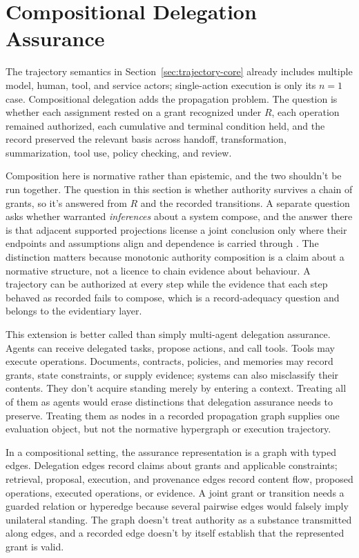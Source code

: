 \section{Compositional Delegation Assurance}
\label{sec:compositional-delegation}

The trajectory semantics in Section~\ref{sec:trajectory-core} already includes multiple model, human, tool, and service actors; single-action execution is only its \(n=1\) case. Compositional delegation adds the propagation problem. The question is whether each assignment rested on a grant recognized under \(R\), each operation remained authorized, each cumulative and terminal condition held, and the record preserved the relevant basis across handoff, transformation, summarization, tool use, policy checking, and review.

Composition here is normative rather than epistemic, and the two shouldn't be run together. The question in this section is whether authority survives a chain of grants, so it's answered from \(R\) and the recorded transitions. A separate question asks whether warranted \emph{inferences} about a system compose, and the answer there is that adjacent supported projections license a joint conclusion only where their endpoints and assumptions align and dependence is carried through \citep{reynolds2026nonComposition}. The distinction matters because monotonic authority composition is a claim about a normative structure, not a licence to chain evidence about behaviour. A trajectory can be authorized at every step while the evidence that each step behaved as recorded fails to compose, which is a record-adequacy question and belongs to the evidentiary layer.

This extension is better called  than simply multi-agent delegation assurance. Agents can receive delegated tasks, propose actions, and call tools. Tools may execute operations. Documents, contracts, policies, and memories may record grants, state constraints, or supply evidence; systems can also misclassify their contents. They don't acquire standing merely by entering a context. Treating all of them as agents would erase distinctions that delegation assurance needs to preserve. Treating them as nodes in a recorded propagation graph supplies one evaluation object, but not the normative hypergraph or execution trajectory.

In a compositional setting, the assurance representation is a graph with typed edges. Delegation edges record claims about grants and applicable constraints; retrieval, proposal, execution, and provenance edges record content flow, proposed operations, executed operations, or evidence. A joint grant or transition needs a guarded relation or hyperedge because several pairwise edges would falsely imply unilateral standing. The graph doesn't treat authority as a substance transmitted along edges, and a recorded edge doesn't by itself establish that the represented grant is valid.

